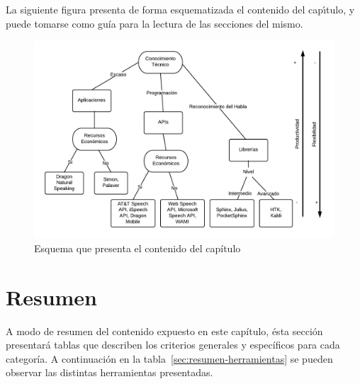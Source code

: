 La siguiente figura presenta de forma esquematizada el contenido del cap{\'\i}tulo, y puede tomarse como
gu\'ia para la lectura de las secciones del mismo.

\begin{figure}[H]
\centering
\includegraphics[width=0.9\linewidth]{./graphics/esquema-herramientas.png}
\caption{Esquema que presenta el contenido del cap\'itulo}
\label{figure:esquema-herramientas}
\end{figure}





\section{Resumen}

A modo de resumen del contenido expuesto en este cap\'itulo, \'esta secci\'on presentar\'a tablas que describen los criterios generales y espec\'ificos
para cada categor\'ia. A continuaci\'on en la tabla~\ref{sec:resumen-herramientas} se pueden observar las distintas
herramientas presentadas.

